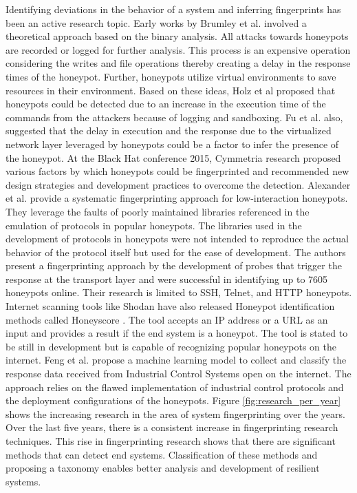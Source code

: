 Identifying deviations in the behavior of a system and inferring fingerprints has been an active research topic. Early works by Brumley et al. \cite{Brumley} involved a theoretical approach based on the binary analysis. All attacks towards honeypots are recorded or logged for further analysis. This process is an expensive operation considering the writes and file operations thereby creating a delay in the response times of the honeypot. Further, honeypots utilize virtual environments to save resources in their environment. Based on these ideas, Holz et al \cite{Holz} proposed that honeypots could be detected due to an increase in the execution time of the commands from the attackers because of logging and sandboxing. Fu et al. \cite{Fu} also, suggested that the delay in execution and the response due to the virtualized network layer leveraged by honeypots could be a factor to infer the presence of the honeypot. At the Black Hat conference 2015, Cymmetria research \cite{BLACKHAT} proposed various factors by which honeypots could be fingerprinted and recommended new design strategies and development practices to overcome the detection. Alexander et al. \cite{Vetterl2018} provide a systematic fingerprinting approach for low-interaction honeypots. They leverage the faults of poorly maintained libraries referenced in the emulation of protocols in popular honeypots. The libraries used in the development of protocols in honeypots were not intended to reproduce the actual behavior of the protocol itself but used for the ease of development. The authors present a fingerprinting approach by the development of probes that trigger the response at the transport layer and were successful in identifying up to 7605 honeypots online. Their research is limited to SSH, Telnet, and HTTP honeypots. Internet scanning tools like Shodan have also released Honeypot identification methods called Honeyscore \cite{SHODAN}. The tool accepts an IP address or a URL as an input and provides a result if the end system is a honeypot. The tool is stated to be still in development but is capable of recognizing popular honeypots on the internet. Feng et al. \cite{Feng2016} propose a machine learning model to collect and classify the response data received from Industrial Control Systems open on the internet. The approach relies on the flawed implementation of industrial control protocols and the deployment configurations of the honeypots. Figure \ref{fig:research_per_year} shows the increasing research in the area of system fingerprinting over the years. Over the last five years, there is a consistent increase in fingerprinting research techniques. This rise in fingerprinting research shows that there are significant methods that can detect end systems. Classification of these methods and proposing a taxonomy enables better analysis and development of resilient systems. 



